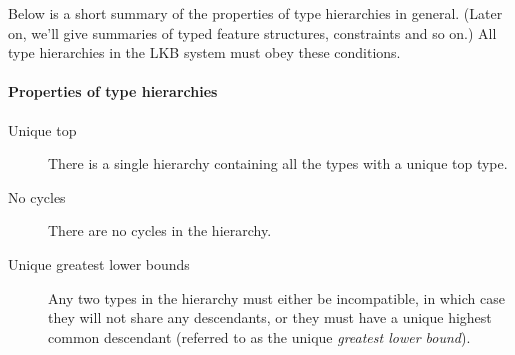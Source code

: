 \documentclass[12pt]{report}
\newcommand{\newterm}[1]{{\it #1}}
\begin{document}
Below is a short summary of 
the properties of type hierarchies in general.
(Later on, we'll give summaries of typed feature structures,
constraints and so on.)  All type hierarchies in the LKB system
must obey these conditions.

\paragraph{Properties of type hierarchies}
\begin{description}
\item[Unique top] There is a single hierarchy containing all the types
with a unique top type.
\item[No cycles] There are no cycles in the hierarchy.  
\item[Unique greatest lower bounds] 
Any two types in the hierarchy must either be incompatible,
in which case they will not share any descendants, or they must
have a unique highest common descendant (referred to as 
the unique \newterm{greatest lower bound}).
\end{description}
\end{document}
